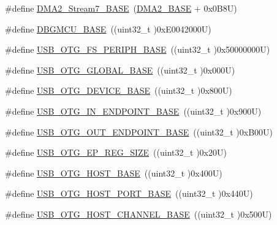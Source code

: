 \begin{DoxyCompactItemize}
\item 
\#define \hyperlink{group___peripheral__registers__structures_gaa9faa708ad2440d24eb1064cba9bb06d}{D\+M\+A2\+\_\+\+Stream7\+\_\+\+B\+A\+SE}~(\hyperlink{group___peripheral__memory__map_gab72a9ae145053ee13d1d491fb5c1df64}{D\+M\+A2\+\_\+\+B\+A\+SE} + 0x0\+B8\+U)
\item 
\#define \hyperlink{group___peripheral__registers__structures_ga4adaf4fd82ccc3a538f1f27a70cdbbef}{D\+B\+G\+M\+C\+U\+\_\+\+B\+A\+SE}~((uint32\+\_\+t )0x\+E0042000\+U)
\item 
\#define \hyperlink{group___peripheral__registers__structures_gaa86d4c80849a74938924e73937b904e7}{U\+S\+B\+\_\+\+O\+T\+G\+\_\+\+F\+S\+\_\+\+P\+E\+R\+I\+P\+H\+\_\+\+B\+A\+SE}~((uint32\+\_\+t )0x50000000\+U)
\item 
\#define \hyperlink{group___peripheral__registers__structures_ga044aa4388e72d9d47a03f387fb8926fb}{U\+S\+B\+\_\+\+O\+T\+G\+\_\+\+G\+L\+O\+B\+A\+L\+\_\+\+B\+A\+SE}~((uint32\+\_\+t )0x000\+U)
\item 
\#define \hyperlink{group___peripheral__registers__structures_ga4d74a337597a77b1fca978202b519a18}{U\+S\+B\+\_\+\+O\+T\+G\+\_\+\+D\+E\+V\+I\+C\+E\+\_\+\+B\+A\+SE}~((uint32\+\_\+t )0x800\+U)
\item 
\#define \hyperlink{group___peripheral__registers__structures_gad8f69041452615aeb3948600e3882246}{U\+S\+B\+\_\+\+O\+T\+G\+\_\+\+I\+N\+\_\+\+E\+N\+D\+P\+O\+I\+N\+T\+\_\+\+B\+A\+SE}~((uint32\+\_\+t )0x900\+U)
\item 
\#define \hyperlink{group___peripheral__registers__structures_gaf0e972b8f028ecf44a652029efbd4642}{U\+S\+B\+\_\+\+O\+T\+G\+\_\+\+O\+U\+T\+\_\+\+E\+N\+D\+P\+O\+I\+N\+T\+\_\+\+B\+A\+SE}~((uint32\+\_\+t )0x\+B00\+U)
\item 
\#define \hyperlink{group___peripheral__registers__structures_ga6fdb7429ad88e2d69440d6ecc4f4199e}{U\+S\+B\+\_\+\+O\+T\+G\+\_\+\+E\+P\+\_\+\+R\+E\+G\+\_\+\+S\+I\+ZE}~((uint32\+\_\+t )0x20\+U)
\item 
\#define \hyperlink{group___peripheral__registers__structures_ga3bb2dd6c82eefd8587b6146ba36ae071}{U\+S\+B\+\_\+\+O\+T\+G\+\_\+\+H\+O\+S\+T\+\_\+\+B\+A\+SE}~((uint32\+\_\+t )0x400\+U)
\item 
\#define \hyperlink{group___peripheral__registers__structures_ga42f433cb79ca69f09972e690fda6737a}{U\+S\+B\+\_\+\+O\+T\+G\+\_\+\+H\+O\+S\+T\+\_\+\+P\+O\+R\+T\+\_\+\+B\+A\+SE}~((uint32\+\_\+t )0x440\+U)
\item 
\#define \hyperlink{group___peripheral__registers__structures_ga942c8c5241b80fbcf638fea0fa18bebd}{U\+S\+B\+\_\+\+O\+T\+G\+\_\+\+H\+O\+S\+T\+\_\+\+C\+H\+A\+N\+N\+E\+L\+\_\+\+B\+A\+SE}~((uint32\+\_\+t )0x500\+U)

\end{DoxyCompactItemize}
